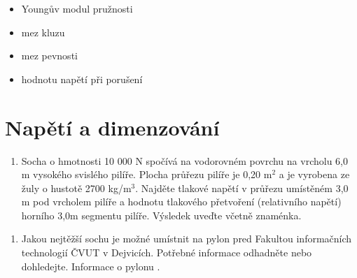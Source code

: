 \documentclass[letterpaper,10pt,english]{jupyterBook}
\begin{document}
{{\begin{itemize}
\item {} 
\sphinxAtStartPar
Youngův modul pružnosti

\item {} 
\sphinxAtStartPar
mez kluzu

\item {} 
\sphinxAtStartPar
mez pevnosti

\item {} 
\sphinxAtStartPar
hodnotu napětí při porušení

\end{itemize}

\sphinxAtStartPar
{}


\section{Napětí a dimenzování}
\label{\detokenize{Cviceni/C2:napeti-a-dimenzovani}}\begin{enumerate}
%
\item {} 
\sphinxAtStartPar
Socha o hmotnosti 10 000 N spočívá na vodorovném povrchu na vrcholu 6,0 m vysokého svislého pilíře. Plocha průřezu pilíře je 0,20 m\(^2\)  a je vyrobena ze žuly o hustotě 2700 kg/m\(^3\).
Najděte tlakové napětí v průřezu umístěném 3,0 m pod vrcholem pilíře a hodnotu tlakového přetvoření (relativního napětí) horního 3,0m segmentu pilíře. Výsledek uveďte včetně znaménka.

\end{enumerate}

\noindent{}

\sphinxAtStartPar
{}
\begin{enumerate}
%
\setcounter{enumi}{1}
\item {} 
\sphinxAtStartPar
Jakou nejtěžší sochu je možné umístnit na pylon pred Fakultou informačních technologií ČVUT v Dejvicích. Potřebné informace odhadněte nebo dohledejte. Informace o pylonu .

\end{enumerate}

}}
\end{document}
